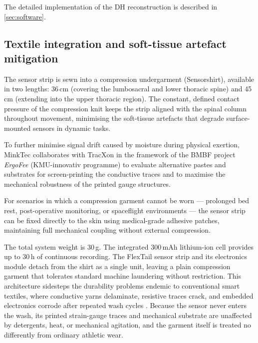 The detailed implementation of the DH reconstruction is described in \cref{sec:software}.

\subsection{Textile integration and soft-tissue artefact mitigation}

The sensor strip is sewn into a compression undergarment (Sensor\-shirt), available in
two lengths: 36\,cm (covering the lumbosacral and lower thoracic spine) and 45\,cm
(extending into the upper thoracic region).
The constant, defined contact pressure of the compression knit keeps the strip aligned
with the spinal column throughout movement, minimising the soft-tissue artefacts that
degrade surface-mounted sensors in dynamic tasks.

To further minimise signal drift caused by moisture during physical exertion,
MinkTec collaborates with TracXon in the framework of the BMBF project
\emph{ErgoFee} (KMU-innovativ programme) to evaluate alternative pastes and
substrates for screen-printing the conductive traces and to maximise the
mechanical robustness of the printed gauge structures.

For scenarios in which a compression garment cannot be worn --- prolonged bed rest,
post-operative monitoring, or spaceflight environments --- the sensor strip can be
fixed directly to the skin using medical-grade adhesive patches, maintaining full
mechanical coupling without external compression.

The total system weight is 30\,g.
The integrated 300\,mAh lithium-ion cell provides up to 30\,h of continuous recording.
The FlexTail sensor strip and its electronics module detach from the shirt as a
single unit, leaving a plain compression garment that tolerates standard machine
laundering without restriction.
This architecture sidesteps the durability problems endemic to conventional smart
textiles, where conductive yarns delaminate, resistive traces crack, and embedded
electronics corrode after repeated wash cycles \cite{rotzler2021, stoppa2014}.
Because the sensor never enters the wash, its printed strain-gauge traces and
mechanical substrate are unaffected by detergents, heat, or mechanical agitation,
and the garment itself is treated no differently from ordinary athletic wear.
